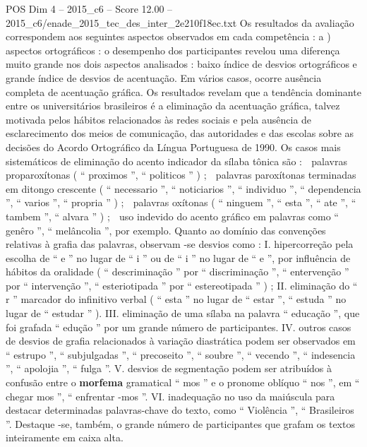 \begin{textsample}{POS Dim 4 – 2015\_c6 – Score 12.00 – 2015\_c6/enade\_2015\_tec\_des\_inter\_2e210f18ec.txt}
Os resultados da avaliação correspondem aos seguintes aspectos observados em cada competência : a ) aspectos ortográficos : o desempenho dos participantes revelou uma diferença muito grande nos dois aspectos analisados : baixo índice de desvios ortográficos e grande índice de desvios de acentuação.
Em vários casos, ocorre ausência completa de acentuação gráfica.
Os resultados revelam que a tendência dominante entre os universitários brasileiros é a eliminação da acentuação gráfica, talvez motivada pelos hábitos relacionados às redes sociais e pela ausência de esclarecimento dos meios de comunicação, das autoridades e das escolas sobre as decisões do Acordo Ortográfico da Língua Portuguesa de 1990.
Os casos mais sistemáticos de eliminação do acento indicador da sílaba tônica são :  palavras proparoxítonas ( “ proximos ”, “ politicos ” ) ;  palavras paroxítonas terminadas em ditongo crescente ( “ necessario ”, “ noticiarios ”, “ individuo ”, “ dependencia ”, “ varios ”, “ propria ” ) ;  palavras oxítonas ( “ ninguem ”, “ esta ”, “ ate ”, “ tambem ”, “ alvara ” ) ;  uso indevido do acento gráfico em palavras como “ genêro ”, “ melâncolia ”, por exemplo.
Quanto ao domínio das convenções relativas à grafia das palavras, observam -se desvios como : I. hipercorreção pela escolha de “ e ” no lugar de “ i ” ou de “ i ” no lugar de “ e ”, por influência de hábitos da oralidade ( “ descriminação ” por “ discriminação ”, “ entervenção ” por “ intervenção ”, “ esteriotipada ” por “ estereotipada ” ) ; II. eliminação do “ r ” marcador do infinitivo verbal ( “ esta ” no lugar de “ estar ”, “ estuda ” no lugar de “ estudar ” ).
III. eliminação de uma sílaba na palavra “ educação ”, que foi grafada “ edução ” por um grande número de participantes.
IV. outros casos de desvios de grafia relacionados à variação diastrática podem ser observados em “ estrupo ”, “ subjulgadas ”, “ precoseito ”, “ soubre ”, “ vecendo ”, “ indesencia ”, “ apolojia ”, “ fulga ”.
V. desvios de segmentação podem ser atribuídos à confusão entre o \textbf{morfema} gramatical “ mos ” e o pronome oblíquo “ nos ”, em “ chegar mos ”, “ enfrentar -mos ”.
VI. inadequação no uso da maiúscula para destacar determinadas palavras-chave do texto, como “ Violência ”, “ Brasileiros ”.
Destaque -se, também, o grande número de participantes que grafam os textos inteiramente em caixa alta.

\end{textsample}
